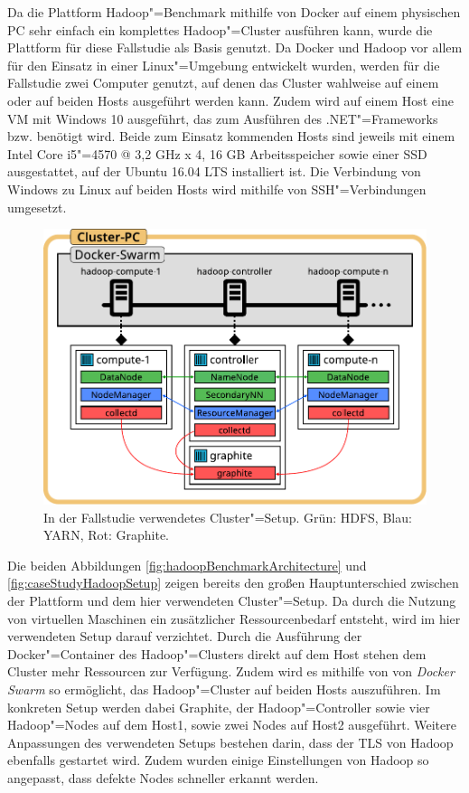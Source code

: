 Da die Plattform Hadoop"=Benchmark mithilfe von Docker auf einem physischen PC sehr einfach ein komplettes Hadoop"=Cluster ausführen kann, wurde die Plattform für diese Fallstudie als Basis genutzt.
Da Docker und Hadoop vor allem für den Einsatz in einer Linux"=Umgebung entwickelt wurden, werden für die Fallstudie zwei Computer genutzt, auf denen das Cluster wahlweise auf einem oder auf beiden Hosts ausgeführt werden kann.
Zudem wird auf einem Host eine VM mit Windows 10 ausgeführt, das zum Ausführen des .NET"=Frameworks bzw. \sS benötigt wird.
Beide zum Einsatz kommenden Hosts sind jeweils mit einem Intel Core i5"=4570 @ 3,2 GHz x 4, 16 GB Arbeitsspeicher sowie einer SSD ausgestattet, auf der Ubuntu 16.04 LTS installiert ist.
Die Verbindung von Windows zu Linux auf beiden Hosts wird mithilfe von SSH"=Verbindungen umgesetzt.

\begin{figure}
    \includegraphics{./images/caseStudyHadoopSetup.pdf}
    \caption[In der Fallstudie verwendetes Cluster"=Setup]
    {In der Fallstudie verwendetes Cluster"=Setup.
        Grün: \ac{HDFS}, Blau: YARN, Rot: Graphite.}
    \label{fig:caseStudyHadoopSetup}
\end{figure}

Die beiden Abbildungen \autoref{fig:hadoopBenchmarkArchitecture} und \autoref{fig:caseStudyHadoopSetup} zeigen bereits den großen Hauptunterschied zwischen der Plattform und dem hier verwendeten Cluster"=Setup.
Da durch die Nutzung von virtuellen Maschinen ein zusätzlicher Ressourcenbedarf entsteht, wird im hier verwendeten Setup darauf verzichtet.
Durch die Ausführung der Docker"=Container des Hadoop"=Clusters direkt auf dem Host stehen dem Cluster mehr Ressourcen zur Verfügung.
Zudem wird es mithilfe von von \emph{Docker Swarm} so ermöglicht, das Hadoop"=Cluster auf beiden Hosts auszuführen.
Im konkreten Setup werden dabei Graphite, der Hadoop"=Controller sowie vier Hadoop"=Nodes auf dem Host1, sowie zwei Nodes auf Host2 ausgeführt.
Weitere Anpassungen des verwendeten Setups bestehen \uA darin, dass der \ac{TLS} von Hadoop ebenfalls gestartet wird.
Zudem wurden einige Einstellungen von Hadoop so angepasst, dass defekte Nodes schneller erkannt werden.

